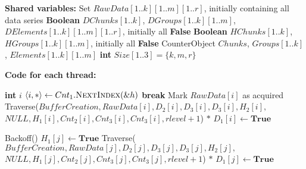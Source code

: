 \begin{algorithm}[t]
    \footnotesize
    \vspace*{2mm}

    \begin{algorithmic}[1]
    
    \State \textbf{Shared variables:}
    \State Set $\mathit{RawData}[1..k][1..m][1..r]$, initially containing all data series \label{alg:bc:r}
    \State \textbf{Boolean} $\mathit{DChunks}[1..k]$, $\mathit{DGroups}[1..k][1..m]$, $\mathit{DElements}[1..k][1..m][1..r]$, initially all \textbf{False} \label{alg:bc:c}
    \State \textbf{Boolean} $\mathit{HChunks}[1..k]$, $\mathit{HGroups}[1..k][1..m]$, initially all \textbf{False} \label{alg:bc:h}
    \State CounterObject $\mathit{Chunks}$, $\mathit{Groups}[1..k]$, $\mathit{Elements}[1..k][1..m]$ \label{alg:bc:e}
    \State \textbf{int} $\mathit{Size}[1..3] = \{k,m,r\}$

    \vspace*{1mm}
    \State \textbf{Code for each thread:}

        \State \textbf{int} $\mathit{i}$
         \label{alg:bc:while:start}
            \State $\langle i, * \rangle \gets Cnt_1.\mbox{\sc NextIndex}(\&h)$
             \textbf{break} \EndIf
            \State Mark $\mathit{RawData[i]}$ as acquired
                \State Traverse($\mathit{BufferCreation, RawData[i], D_2[i], D_3[i], D_3[i], H_2[i],}$
                \Statex \quad $\mathit{NULL, H_1[i], Cnt_2[i], Cnt_3[i], Cnt_3[i], rlevel+1}$) \label{alg:bc:recur}
            \Else
                \State $*$
            \EndIf
            \State $\mathit{D_1[i]} \gets \textbf{True}$ \label{alg:bc:c:true}
        \EndWhile

         \label{alg:bc:scan:for}
            \State Backoff()  \label{alg:bc:help:backoff}
             \label{alg:bc:help:if}
                \State $\mathit{H_1[j]} \gets \textbf{True}$ \label{alg:bc:h:true}
                    \State Traverse($\mathit{BufferCreation, RawData[j], D_2[j], D_3[j], D_3[j], H_2[j],}$
                    \Statex \quad $\mathit{NULL, H_1[j], Cnt_2[j], Cnt_3[j], Cnt_3[j], rlevel+1}$) \label{alg:bc:help:process}
                \Else
                    \State $*$
                \EndIf
                \State $\mathit{D_1[j]} \gets \textbf{True}$ \label{alg:bc:help:c:true}
            \EndIf
        \EndFor
    \EndProcedure


\end{algorithmic}
\end{algorithm}
